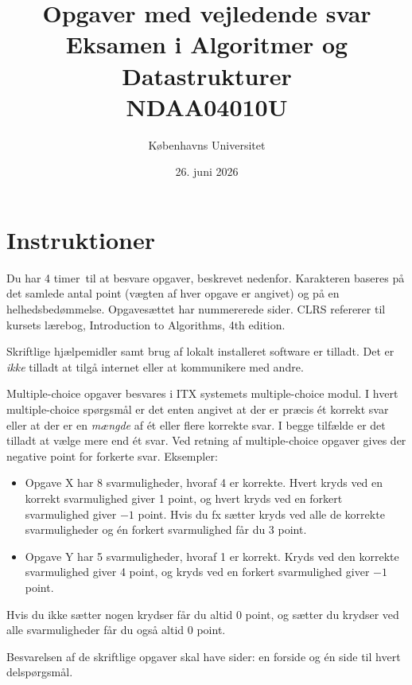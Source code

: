 \documentclass[12pt]{article}
\newcommand{\examdate}{26. juni 2026}
\newcommand{\examduration}{4 timer}
\newcommand{\problemfile}{ad-problems-2026-june} %
\newcounter{svarside}
\newcommand{\medsvar}{{\bf Opgaver med vejledende svar}\\}
\newcommand{\medsvar}{}
\begin{document}
\title{\Large \medsvar Eksamen i Algoritmer og Datastrukturer\\
{\small NDAA04010U}}

\author{Københavns Universitet}
\date{\examdate}

\maketitle

\section*{Instruktioner}

Du har \examduration\ til at besvare  opgaver, beskrevet nedenfor.
Karakteren baseres på det samlede antal point (vægten af hver opgave er angivet) og på en helhedsbedømmelse.
Opgavesættet har \pageref{page:last} nummererede sider.
CLRS refererer til kursets lærebog, Introduction to Algorithms, 4th edition.

\medskip

Skriftlige hjælpemidler samt brug af lokalt installeret software er tilladt. Det er \emph{ikke} tilladt at tilgå internet eller at kommunikere med andre.

\medskip

Multiple-choice opgaver besvares i ITX systemets multiple-choice modul.
I hvert multiple-choice spørgsmål er det enten angivet at der er præcis ét korrekt svar eller at der er en \emph{mængde} af ét eller flere korrekte svar.
I begge tilfælde er det tilladt at vælge mere end ét svar.
Ved retning af multiple-choice opgaver gives der negative point for forkerte svar.
Eksempler:
\begin{itemize}
\item Opgave X har 8 svarmuligheder, hvoraf 4 er korrekte.
Hvert kryds ved en korrekt svarmulighed giver 1 point, og hvert kryds ved en forkert svarmulighed giver $-1$ point.
Hvis du fx sætter kryds ved alle de korrekte svarmuligheder og én forkert svarmulighed får du 3 point.
\item Opgave Y har 5 svarmuligheder, hvoraf 1 er korrekt.
Kryds ved den korrekte svarmulighed giver 4 point, og kryds ved en forkert svarmulighed giver $-1$ point.
\end{itemize}
Hvis du ikke sætter nogen krydser får du altid 0 point, og sætter du krydser ved alle svarmuligheder får du også altid 0 point.

\medskip

Besvarelsen af de skriftlige opgaver skal have  sider: en forside og én side til hvert delspørgsmål.

\newpage


\end{document}
